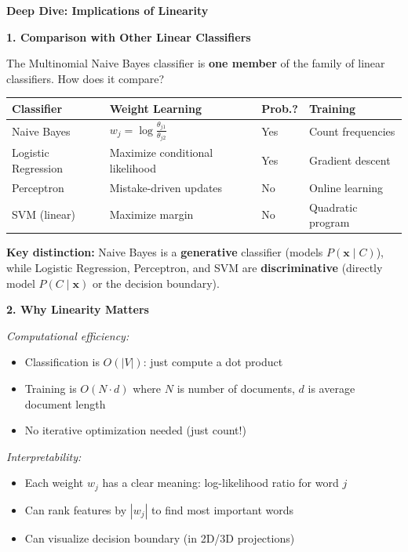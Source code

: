 \documentclass[12pt]{article}
\begin{document}
\begin{explanation}
\textbf{Deep Dive: Implications of Linearity}

\textbf{1. Comparison with Other Linear Classifiers}

The Multinomial Naive Bayes classifier is \textbf{one member} of the family of linear classifiers. How does it compare?

\begin{center}
\small
\begin{tabular}{|p{2.8cm}|p{4.2cm}|p{1.8cm}|p{2.8cm}|}
\hline
\textbf{Classifier} & \textbf{Weight Learning} & \textbf{Prob.?} & \textbf{Training} \\
\hline
Naive Bayes & $w_j = \log \frac{\theta_{j1}}{\theta_{j2}}$ & Yes & Count frequencies \\
\hline
Logistic Regression & Maximize conditional likelihood & Yes & Gradient descent \\
\hline
Perceptron & Mistake-driven updates & No & Online learning \\
\hline
SVM (linear) & Maximize margin & No & Quadratic program \\
\hline
\end{tabular}
\end{center}

\textbf{Key distinction:} Naive Bayes is a \textbf{generative} classifier (models $P(\mathbf{x} \mid C)$), while Logistic Regression, Perceptron, and SVM are \textbf{discriminative} (directly model $P(C \mid \mathbf{x})$ or the decision boundary).

\textbf{2. Why Linearity Matters}

\textit{Computational efficiency:}
\begin{itemize}
    \item Classification is $O(|V|)$: just compute a dot product
    \item Training is $O(N \cdot d)$ where $N$ is number of documents, $d$ is average document length
    \item No iterative optimization needed (just count!)
\end{itemize}

\textit{Interpretability:}
\begin{itemize}
    \item Each weight $w_j$ has a clear meaning: log-likelihood ratio for word $j$
    \item Can rank features by $|w_j|$ to find most important words
    \item Can visualize decision boundary (in 2D/3D projections)
\end{itemize}


\end{explanation}
\end{document}

